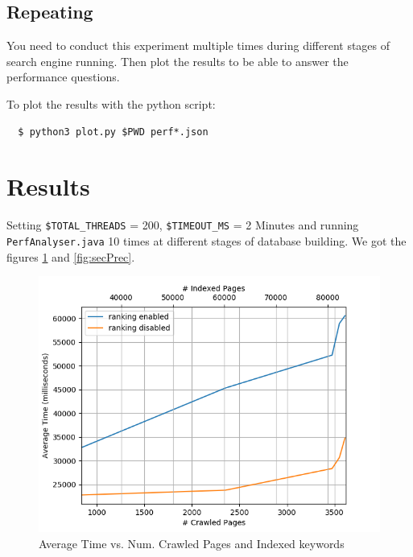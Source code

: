 \documentclass[12pt]{IEEEtran}
\begin{document}
\subsection{Repeating}
You need to conduct this experiment multiple times during different stages of search engine running. Then plot the results to be able to answer the performance questions.

To plot the results with the python script:
\begin{lstlisting}
  $ python3 plot.py $PWD perf*.json
\end{lstlisting}

\section{Results}
Setting \small\texttt{\$TOTAL\_THREADS} = 200, \small\texttt{\$TIMEOUT\_MS} = 2 Minutes and running \small\texttt{PerfAnalyser.java} 10 times at different stages of database building.
We got the figures \ref{fig:avgtime} and \ref{fig:secPrec}.

\begin{figure}
  \centering
  \includegraphics[width=\linewidth]{avgtime.png}
  \caption{Average Time vs. Num. Crawled Pages and Indexed keywords}
  \label{fig:avgtime}
\end{figure}
\end{document}
